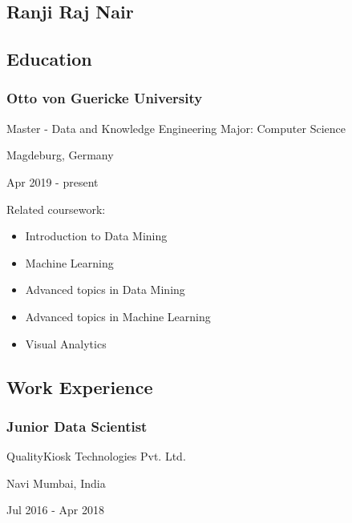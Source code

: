 \documentclass[
]{article}
\providecommand{\tightlist}{%
  \setlength{\itemsep}{0pt}\setlength{\parskip}{0pt}}
\begin{document}
\hypertarget{title}{%
\subsection{Ranji Raj Nair}\label{title}}

\hypertarget{education}{%
\subsection{Education}\label{education}}

\hypertarget{otto-von-guericke-university}{%
\subsubsection{Otto von Guericke
University}\label{otto-von-guericke-university}}

Master - Data and Knowledge Engineering Major: Computer Science

Magdeburg, Germany

Apr 2019 - present

Related coursework:

\begin{itemize}
\tightlist
\item
  Introduction to Data Mining
\item
  Machine Learning
\item
  Advanced topics in Data Mining
\item
  Advanced topics in Machine Learning
\item
  Visual Analytics
\end{itemize}

\hypertarget{work-experience}{%
\subsection{Work Experience}\label{work-experience}}

\hypertarget{junior-data-scientist}{%
\subsubsection{Junior Data Scientist}\label{junior-data-scientist}}

QualityKiosk Technologies Pvt. Ltd.

Navi Mumbai, India

Jul 2016 - Apr 2018
\end{document}
